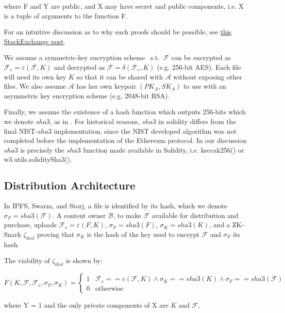 \documentclass[12pt,oneside]{amsart}
\makeatletter
\def\file{\mathcal{F}}
\def\hash{sha3}
\def\alice{\mathcal{A}}
\def\bob{\mathcal{B}}
\def\zksnark{\zeta}
\def\encrypt{\varepsilon}
\def\decrypt{\delta}
\newcommand{\st}{\mbox{ s.t. }}
\newcommand*\ie{i.e.\@\xspace}
\makeatother
\begin{document}
\begin{multicols}{2}
where F and Y are public, and X may have secret and public components, \ie X is a tuple of arguments to the function F.

For an intuitive discussion as to why such proofs should be possible, see \href{https://crypto.stackexchange.com/questions/37581/why-are-zk-snarks-possible-in-laymans-terms}{this StackExchange post}.

We assume a symmetric-key encryption scheme \st $\file$ can be encrypted as $\file_e = \encrypt(\file, K)$ and decrypted as $\file = \decrypt(\file_e, K)$ (e.g. 256-bit AES).
Each file will need its own key $K$ so that it can be shared with $\alice$ without exposing other files.
We also assume $\alice$ has her own keypair $(PK_A, SK_A)$ to use with an asymmetric key encryption scheme (e.g. 2048-bit RSA).

Finally, we assume the existence of a hash function which outputs 256-bits which we denote $\hash$, as in \cite{wood2015ethereum}.
For historical reasons, $\hash$ in solidity differs from the final NIST-$\hash$ implementation, since the NIST developed algorithm was not completed before the implementation of the Ethereum protocol.
In our discussion $\hash$ is precisely the $\hash$ function made available in Solidity, i.e. keccak256() or w3.utils.soliditySha3().

\end{multicols}
\subsection{Distribution Architecture}

In IPFS, Swarm, and Storj, a file is identified by its hash, which we denote $\sigma_F = \hash(\file)$.
A content owner $\bob$, to make $\file$ available for distribution and purchase, uploads
$\file_e = \encrypt(F, K)$,
$\sigma_F = \hash(F)$,
$\sigma_K = \hash(K)$,
and a ZK-Snark $\zksnark_{dist}$ proving that $\sigma_K$ is the hash of the key used to encrypt $\file$ and $\sigma_F$ its hash.

The viability of $\zksnark_{dist}$ is shown by:

\[
F(K, \file, \file_e, \sigma_F, \sigma_K) =
  \begin{cases}
    1 & \file_e == \encrypt(\file, K) \wedge \sigma_K == \hash(K) \wedge \sigma_F == \hash(\file) \\
    0 & \text{otherwise}
  \end{cases}
\]

where Y = 1 and the only private components of X are $K$ and $\file$.
\end{document}
